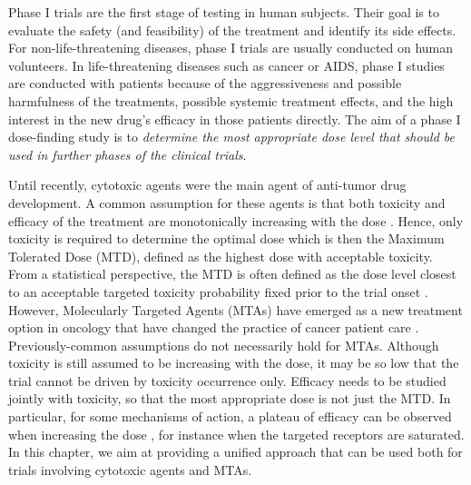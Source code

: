 Phase I trials are the first stage of testing in human subjects. Their goal is to evaluate the safety (and feasibility) of the treatment and identify its side effects. For non-life-threatening diseases, phase I trials are usually conducted on human volunteers. In life-threatening diseases such as cancer or AIDS, phase I studies are conducted with patients because of the aggressiveness and possible harmfulness of the treatments, possible systemic treatment effects, and the high interest in the new drug's efficacy in those patients directly. The aim of a phase I dose-finding study is to \emph{determine the most appropriate dose level that should be used in further phases of the clinical trials}. 

Until recently, cytotoxic agents were the main agent of anti-tumor drug development. A common assumption for these agents is that both toxicity and efficacy of the treatment are monotonically increasing with the dose \cite{chevret06}. Hence, only toxicity is required to determine the optimal dose which is then the Maximum Tolerated Dose (MTD), defined as the highest dose with acceptable toxicity. From a statistical perspective, the MTD is often defined as the dose level closest to an acceptable targeted toxicity probability fixed prior to the trial onset \cite{faries94,storer89}. However, Molecularly Targeted Agents (MTAs) have emerged as a new treatment option in oncology that have changed the practice of cancer patient care \cite{Postel-Vinay09,letourneau10,letourneau11,letourneau12}. Previously-common assumptions do not necessarily hold for MTAs. Although toxicity is still assumed to be increasing with the dose, it may be so low that the trial cannot be driven by toxicity occurrence only. Efficacy needs to be studied jointly with toxicity, so that the most appropriate dose is not just the MTD. In particular, for some mechanisms of action, a plateau of efficacy can be observed when increasing the dose \cite{hoering11}, for instance when the targeted receptors are saturated. In this chapter, we aim at providing a unified approach that can be used both for trials involving cytotoxic agents and MTAs.

